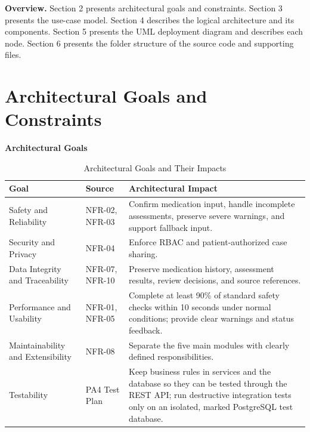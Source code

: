 \documentclass[10pt,letterpaper]{article}
\newcommand{\upd}[1]{{\color{pafourblue}#1}}
\begin{document}
\medskip
\noindent\textbf{Overview.}
Section 2 presents architectural goals and constraints.
Section 3 presents the use-case model.
Section 4 describes the logical architecture and its components.
\upd{Section 5 presents the UML deployment diagram and describes each node.
Section 6 presents the folder structure of the source code and supporting files.}


\clearpage
\section{Architectural Goals and Constraints}
\label{sec:architectural-goals}

\medskip
\noindent\textbf{Architectural Goals}

\begin{table}[!htbp]
\centering
\caption{Architectural Goals and Their Impacts}
\label{tab:architectural-goals}

\begin{tabularx}{\textwidth}{|L{3cm}|L{2cm}|Y|}
\hline
\textbf{Goal} & \textbf{Source} &
\textbf{Architectural Impact} \\ \hline

Safety and Reliability & NFR-02, NFR-03 &
Confirm medication input, handle incomplete assessments,
preserve severe warnings, and support fallback input.
\\ \hline

Security and Privacy & NFR-04 &
Enforce RBAC and patient-authorized case sharing.
\\ \hline

Data Integrity and Traceability & NFR-07, NFR-10 &
Preserve medication history, assessment results,
review decisions, and source references.
\\ \hline

Performance and Usability & NFR-01, NFR-05 &
Complete at least 90\% of standard safety checks within
10 seconds under normal conditions; provide clear
warnings and status feedback.
\\ \hline

Maintainability and Extensibility & NFR-08 &
Separate the five main modules with clearly defined
responsibilities.
\\ \hline

\upd{Testability} & \upd{PA4 Test Plan} &
\upd{Keep business rules in services and the database so they can be
tested through the REST API; run destructive integration tests only on an
isolated, marked PostgreSQL test database.}
\\ \hline

\end{tabularx}
\end{table}
\end{document}
